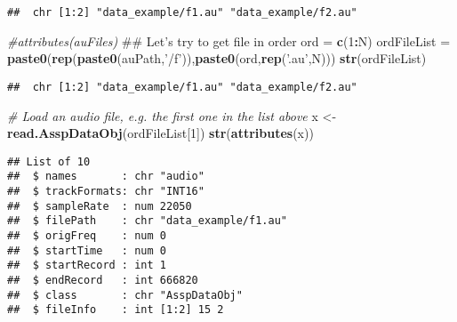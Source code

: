 \documentclass[]{article}
\newenvironment{Shaded}{\begin{snugshade}}{\end{snugshade}}
\newcommand{\KeywordTok}[1]{\textcolor[rgb]{0.13,0.29,0.53}{\textbf{#1}}}
\newcommand{\DecValTok}[1]{\textcolor[rgb]{0.00,0.00,0.81}{#1}}
\newcommand{\StringTok}[1]{\textcolor[rgb]{0.31,0.60,0.02}{#1}}
\newcommand{\CommentTok}[1]{\textcolor[rgb]{0.56,0.35,0.01}{\textit{#1}}}
\newcommand{\ControlFlowTok}[1]{\textcolor[rgb]{0.13,0.29,0.53}{\textbf{#1}}}
\newcommand{\OperatorTok}[1]{\textcolor[rgb]{0.81,0.36,0.00}{\textbf{#1}}}
\newcommand{\NormalTok}[1]{#1}
\begin{document}
\begin{verbatim}
##  chr [1:2] "data_example/f1.au" "data_example/f2.au"
\end{verbatim}

\begin{Shaded}
\begin{Highlighting}[]
\CommentTok{#attributes(auFiles)}
\NormalTok{## Let's try to get file in order }
\NormalTok{ord =}\StringTok{ }\KeywordTok{c}\NormalTok{(}\DecValTok{1}\OperatorTok{:}\NormalTok{N)}
\NormalTok{ordFileList =}\StringTok{ }\KeywordTok{paste0}\NormalTok{(}\KeywordTok{rep}\NormalTok{(}\KeywordTok{paste0}\NormalTok{(auPath,}\StringTok{'/f'}\NormalTok{)),}\KeywordTok{paste0}\NormalTok{(ord,}\KeywordTok{rep}\NormalTok{(}\StringTok{'.au'}\NormalTok{,N)))}
\KeywordTok{str}\NormalTok{(ordFileList)}
\end{Highlighting}
\end{Shaded}

\begin{verbatim}
##  chr [1:2] "data_example/f1.au" "data_example/f2.au"
\end{verbatim}

\begin{Shaded}
\begin{Highlighting}[]
\CommentTok{# Load an audio file, e.g. the first one in the list above}
\NormalTok{x <-}\StringTok{ }\KeywordTok{read.AsspDataObj}\NormalTok{(ordFileList[}\DecValTok{1}\NormalTok{])}
\KeywordTok{str}\NormalTok{(}\KeywordTok{attributes}\NormalTok{(x))}
\end{Highlighting}
\end{Shaded}

\begin{verbatim}
## List of 10
##  $ names       : chr "audio"
##  $ trackFormats: chr "INT16"
##  $ sampleRate  : num 22050
##  $ filePath    : chr "data_example/f1.au"
##  $ origFreq    : num 0
##  $ startTime   : num 0
##  $ startRecord : int 1
##  $ endRecord   : int 666820
##  $ class       : chr "AsspDataObj"
##  $ fileInfo    : int [1:2] 15 2
\end{verbatim}

\begin{Shaded}
\end{Shaded}
\end{document}
